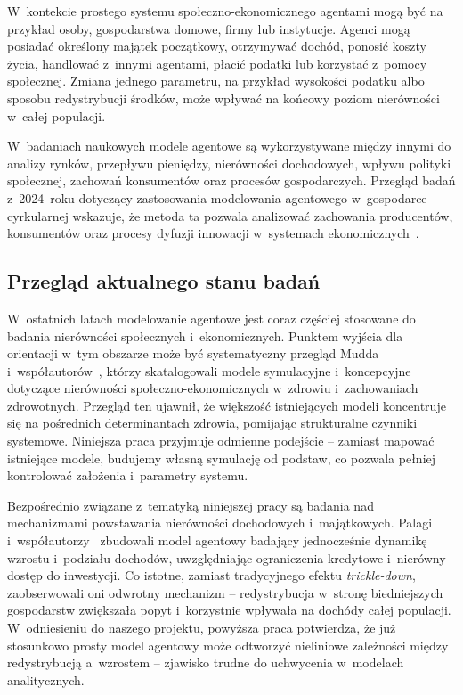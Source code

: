 \documentclass[polish]{projectreport}
\begin{document}
W~kontekcie prostego systemu spo\l{}eczno-ekonomicznego agentami mog\k{a} by\'{c} na przyk\l{}ad
osoby, gospodarstwa domowe, firmy lub instytucje. Agenci mog\k{a} posiada\'{c} okre\'slony
maj\k{a}tek pocz\k{a}tkowy, otrzymywa\'{c} doch\'od, ponosi\'{c} koszty \.{z}ycia, handlowa\'{c} z~innymi
agentami, p\l{}aci\'{c} podatki lub korzysta\'{c} z~pomocy spo\l{}ecznej. Zmiana jednego parametru,
na przyk\l{}ad wysoko\'sci podatku albo sposobu redystrybucji \'srodk\'ow, mo\.{z}e wp\l{}ywa\'{c} na
ko\'ncowy poziom nier\'owno\'sci w~ca\l{}ej populacji.

W~badaniach naukowych modele agentowe s\k{a} wykorzystywane mi\k{e}dzy innymi do analizy
rynk\'ow, przep\l{}ywu pieni\k{e}dzy, nier\'owno\'sci dochodowych, wp\l{}ywu polityki spo\l{}ecznej,
zachowa\'n konsument\'ow oraz proces\'ow gospodarczych. Przegl\k{a}d bada\'n z~2024~roku dotycz\k{a}cy
zastosowania modelowania agentowego w~gospodarce cyrkularnej wskazuje, \.{z}e metoda ta
pozwala analizowa\'{c} zachowania producent\'ow, konsument\'ow oraz procesy dyfuzji innowacji
w~systemach ekonomicznych~\cite{mudd2024}.

\subsection{Przegl\k{a}d aktualnego stanu bada\'n}
\label{sec:related}

W~ostatnich latach modelowanie agentowe jest coraz cz\k{e}\'sciej stosowane do badania
nier\'owno\'sci spo\l{}ecznych i~ekonomicznych. Punktem wyj\'scia dla orientacji w~tym obszarze
mo\.{z}e by\'{c} systematyczny przegl\k{a}d Mudda i~wsp\'o\l{}autor\'ow~\cite{mudd2024}, kt\'orzy skatalogowali
modele symulacyjne i~koncepcyjne dotycz\k{a}ce nier\'owno\'sci spo\l{}eczno-ekonomicznych
w~zdrowiu i~zachowaniach zdrowotnych. Przegl\k{a}d ten ujawni\l{}, \.{z}e wi\k{e}kszo\'s\'{c} istniej\k{a}cych
modeli koncentruje si\k{e} na po\'srednich determinantach zdrowia, pomijaj\k{a}c strukturalne
czynniki systemowe. Niniejsza praca przyjmuje odmienne podej\'scie -- zamiast mapowa\'{c}
istniej\k{a}ce modele, budujemy w\l{}asn\k{a} symulacj\k{e} od podstaw, co pozwala pe\l{}niej
kontrolowa\'{c} za\l{}o\.{z}enia i~parametry systemu.

Bezpo\'srednio zwi\k{a}zane z~tematyk\k{a} niniejszej pracy s\k{a} badania nad mechanizmami powstawania
nier\'owno\'sci dochodowych i~maj\k{a}tkowych. Palagi i~wsp\'o\l{}autorzy~\cite{palagi2023} zbudowali
model agentowy badaj\k{a}cy jednocze\'snie dynamik\k{e} wzrostu i~podzia\l{}u dochod\'ow, uwzgl\k{e}dniaj\k{a}c
ograniczenia kredytowe i~nier\'owny dost\k{e}p do inwestycji. Co istotne, zamiast tradycyjnego
efektu \emph{trickle-down}, zaobserwowali oni odwrotny mechanizm -- redystrybucja
w~stron\k{e} biedniejszych gospodarstw zwi\k{e}ksza\l{}a popyt i~korzystnie wp\l{}ywa\l{}a na doch\'ody
ca\l{}ej populacji. W~odniesieniu do naszego projektu, powy\.{z}sza praca potwierdza, \.{z}e ju\.{z}
stosunkowo prosty model agentowy mo\.{z}e odtworzy\'{c} nieliniowe zale\.{z}no\'sci mi\k{e}dzy
redystrybucj\k{a} a~wzrostem -- zjawisko trudne do uchwycenia w~modelach analitycznych.
\end{document}
